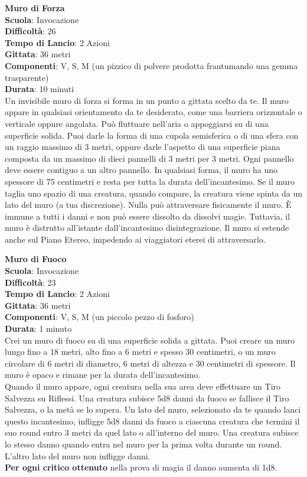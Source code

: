 \begin{multicols}{2}
\medskip\textbf{Muro di Forza}\\
\textbf{Scuola}: Invocazione\\
\textbf{Difficoltà}: 26\\
\textbf{Tempo di Lancio}: 2 Azioni\\
\textbf{Gittata}: 36 metri\\
\textbf{Componenti}: V, S, M (un pizzico di polvere prodotta frantumando una gemma trasparente)\\
\textbf{Durata}: 10 minuti\\
Un invisibile muro di forza si forma in un punto a gittata scelto da te. Il muro appare in qualsiasi orientamento da te desiderato, come una barriera orizzontale o verticale oppure angolata. Può fluttuare nell'aria o appoggiarsi su di una superficie solida. Puoi darle la forma di una cupola semisferica o di una sfera con un raggio massimo di 3 metri, oppure darle l'aspetto di una superficie piana composta da un massimo di dieci pannelli di 3 metri per 3 metri. Ogni pannello deve essere contiguo a un altro pannello. In qualsiasi forma, il muro ha uno spessore di 75 centimetri e resta per tutta la durata dell'incantesimo. Se il muro taglia uno spazio di una creatura, quando compare, la creatura viene spinta da un lato del muro (a tua discrezione). Nulla può attraversare fisicamente il muro. È immune a tutti i danni e non può essere dissolto da dissolvi magie. Tuttavia, il muro è distrutto all'istante dall'incantesimo disintegrazione. Il muro si estende anche sul Piano Etereo, impedendo ai viaggiatori eterei di attraversarlo.

\medskip\textbf{Muro di Fuoco}\\
\textbf{Scuola}: Invocazione\\
\textbf{Difficoltà}: 23\\
\textbf{Tempo di Lancio}: 2 Azioni\\
\textbf{Gittata}: 36 metri\\
\textbf{Componenti}: V, S, M (un piccolo pezzo di fosforo)\\
\textbf{Durata}: 1 minuto\\
Crei un muro di fuoco su di una superficie solida a gittata. Puoi creare un muro lungo fino a 18 metri, alto fino a 6 metri e spesso 30 centimetri, o un muro circolare di 6 metri di diametro, 6 metri di altezza e 30 centimetri di spessore. Il muro è opaco e rimane per la durata dell'incantesimo. \\
Quando il muro appare, ogni creatura nella sua area deve effettuare un Tiro Salvezza su Riflessi. Una creatura subisce 5d8 danni da fuoco se fallisce il Tiro Salvezza, o la metà se lo supera. Un lato del muro, selezionato da te quando lanci questo incantesimo, infligge 5d8 danni da fuoco a ciascuna creatura che termini il suo round entro 3 metri da quel lato o all'interno del muro. Una creatura subisce lo stesso danno quando entra nel muro per la prima volta durante un round. L'altro lato del muro non infligge danni.\\
\textbf{Per ogni critico ottenuto} nella prova di magia il danno aumenta di 1d8.


\end{multicols}
